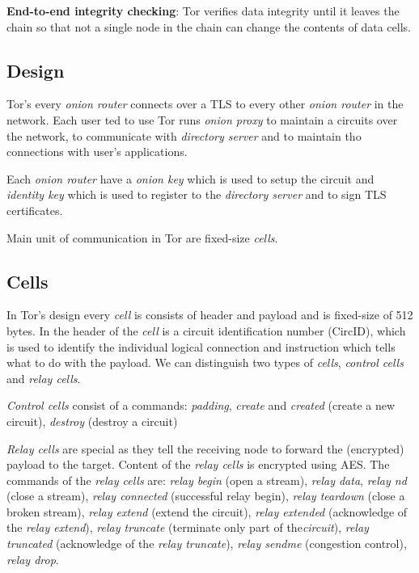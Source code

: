 \documentclass{acm_proc_article-sp}
\begin{document}
\textbf{End-to-end integrity checking}: Tor verifies data integrity until it leaves the chain so that not a single node in the chain can change the contents of data cells. \cite{cite6}

\subsection{Design}

Tor's every \textit{onion router} connects over a TLS to every other \textit{onion router} in the network. Each user ted to use Tor runs \textit{onion proxy} to maintain a circuits over the network, to communicate with \textit{directory server} and to maintain tho connections with user's applications.  \cite{cite6}

Each \textit{onion router} have a \textit{onion key} which is used to setup the circuit and \textit{identity key} which is used to register to the \textit{directory server} and to sign TLS certificates.  \cite{cite6}

Main unit of communication in Tor are fixed-size \textit{cells}.  \cite{cite6}

\subsection{Cells}

In Tor's design every \textit{cell} is consists of header and payload and is fixed-size of 512 bytes. In the header of the \textit{cell} is a circuit identification number (CircID), which is used to identify the individual logical connection and instruction which tells what to do with the payload. We can distinguish two types of \textit{cells},  \textit{control cells} and  \textit{relay cells}.  \cite{cite6}

\textit{Control cells} consist of a commands: \textit{padding}, \textit{create} and \textit{created} (create a new circuit), \textit{destroy} (destroy a circuit) \cite{cite6}

\textit{Relay cells} are special as they tell the receiving node to forward the (encrypted) payload to the target. Content of the \textit{relay cells} is encrypted using AES. The commands of the \textit{relay cells} are: \textit{relay begin} (open a stream), \textit{relay data}, \textit{relay nd} (close a stream), \textit{relay connected} (successful  relay begin), \textit{relay teardown} (close a broken stream), \textit{relay extend} (extend the circuit), \textit{relay extended} (acknowledge of the  \textit{relay extend}),  \textit{relay truncate} (terminate only part of the\textit{circuit}),  \textit{relay truncated} (acknowledge of the  \textit{relay truncate}),  \textit{relay sendme} (congestion control),  \textit{relay drop}.  \cite{cite6}
\end{document}
